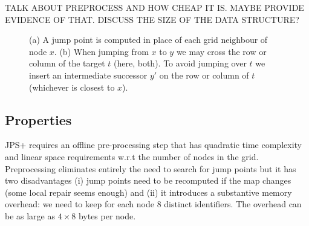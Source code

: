 TALK ABOUT PREPROCESS AND HOW CHEAP IT IS.  
MAYBE PROVIDE EVIDENCE OF THAT.  
DISCUSS THE SIZE OF THE DATA STRUCTURE?

\begin{figure}[tb]
       \begin{center}
         \scalebox{.8}{}
       \end{center}
	\vspace{-3pt}
       \caption{(a) A jump point is computed in place of each grid neighbour of node $x$.
		(b) When jumping from $x$ to $y$ we may cross the row or column of the target $t$ (here, both). 
To avoid jumping over $t$ we insert an intermediate successor $y'$ on the row or column of $t$ (whichever is closest to $x$).}

       \label{fig:preproc}
\end{figure}

\subsection*{Properties}
JPS+ requires an offline pre-processing step that has quadratic time complexity
and linear space requirements w.r.t the number of nodes in the grid.
Preprocessing eliminates entirely the need to search for jump
points but it has two disadvantages (i) jump points need to be recomputed
if the map changes (some local repair seems enough) and (ii) it introduces 
a substantive memory overhead: we need to keep for each node 8 distinct identifiers. 
The overhead can be as large as $4\times8$ bytes per node. 
